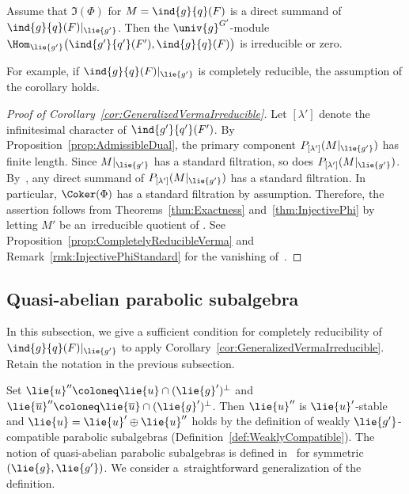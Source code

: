 \begin{Corollary}\label{cor:GeneralizedVermaIrreducible}
	Assume that $\Im(\Phi)$ for $M = \ind{g}{q}(F)$ is a direct summand of $\ind{g}{q}(F)|_{\lie{g'}}$.
	Then the $\univ{g}^{G'}$-module $\Hom_{\lie{g'}}\bigl(\ind{g'}{q'}(F'), \ind{g}{q}(F)\bigr)$ is irreducible or zero.
\end{Corollary}

\begin{Remark}
	For example, if $\ind{g}{q}(F)|_{\lie{g'}}$ is completely reducible, the assumption of the corollary holds.
\end{Remark}

\begin{proof}[Proof of Corollary~\ref{cor:GeneralizedVermaIrreducible}]
	Let $[\lambda']$ denote the infinitesimal character of $\ind{g'}{q'}(F')$.
	By Proposition~\ref{prop:AdmissibleDual}, the primary component $P_{[\lambda']}(M|_{\lie{g'}})$ has finite length.
	Since $M|_{\lie{g'}}$ has a standard filtration, so does $P_{[\lambda']}(M|_{\lie{g'}})$.
	By~\cite[Proposition~3.7 and Theorem~9.8\,(3)]{Hu08_category_o}, any direct summand of $P_{[\lambda']}(M|_{\lie{g'}})$ has a standard filtration.
	In particular, $\Coker(\Phi)$ has a standard filtration by assumption.
	Therefore, the assertion follows from Theorems~\ref{thm:Exactness} and~\ref{thm:InjectivePhi} by letting $M'$ be an~irreducible quotient of .
	See Proposition~\ref{prop:CompletelyReducibleVerma} and Remark~\ref{rmk:InjectivePhiStandard} for the vanishing of~.
\end{proof}

\subsection{Quasi-abelian parabolic subalgebra}

In this subsection, we give a sufficient condition for completely reducibility of $\ind{g}{q}(F)|_{\lie{g'}}$
to apply Corollary~\ref{cor:GeneralizedVermaIrreducible}.
Retain the notation in the previous subsection.

Set $\lie{u}''\coloneq \lie{u} \cap (\lie{g}')^\perp$ and $\lie{\overline{u}}''\coloneq \lie{\overline{u}} \cap (\lie{g}')^\perp$.
Then $\lie{u}''$ is $\lie{u}'$-stable and $\lie{u} = \lie{u}' \oplus \lie{u}''$ holds by the definition of weakly $\lie{g'}$-compatible parabolic subalgebras (Definition~\ref{def:WeaklyCompatible}).
The notion of quasi-abelian parabolic subalgebras is defined in~\cite[p.~109]{EnPaWaWo85} for symmetric $(\lie{g}, \lie{g'})$.
We consider a~straightforward generalization of the definition.


